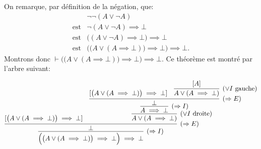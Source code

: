 \documentclass[12pt,french,a4paper]{article}
\begin{document}
\begin{question}

On remarque, par définition de la négation, que:
\begin{eqnarray*}
& \neg \neg (A \vee \neg A) \\
\mbox{est} &\neg (A \vee \neg A) \implies \bot \\
\mbox{est} & \big( (A \vee \neg A) \implies \bot\big) \implies \bot \\
\mbox{est} & \Big( \big(A \vee (A \implies \bot) \big) \implies \bot \Big) \implies \bot.
\end{eqnarray*}
Montrons donc $\vdash \Big( \big(A \vee (A \implies \bot) \big) \implies \bot \Big) \implies \bot$.
Ce théorème est montré par l'arbre suivant:

\[
\infer[(\Rightarrow{}I)]{\Big( \big(A \vee (A \implies \bot) \big) \implies \bot \Big) \implies \bot}{
\infer[(\Rightarrow{}E)]{\bot}{[\big(A \vee (A \implies \bot) \big) \implies \bot] & 
\infer[(\vee I \text{ droite})]{A \vee (A \implies \bot)}{
\infer[(\Rightarrow{}I)]{A \implies \bot}{
\infer[(\Rightarrow{}E)]{\bot}{[\big(A \vee (A \implies \bot) \big) \implies \bot] & 
\infer[(\vee I \text{ gauche})]{A \vee (A \implies \bot)}{[A]}
}
}
}
}
}
\]

\end{question}
\end{document}
